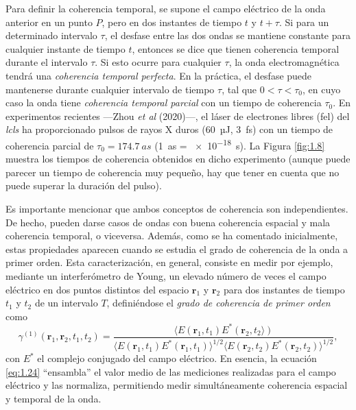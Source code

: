 Para definir la coherencia temporal, se supone el campo eléctrico de la onda anterior en un punto $P$, pero en dos instantes de tiempo $t$ y $t+\tau$. Si para un determinado intervalo $\tau$, el desfase entre las dos ondas se mantiene constante para cualquier instante de tiempo $t$, entonces se dice que tienen coherencia temporal durante el intervalo $\tau$. Si esto ocurre para cualquier $\tau$, la onda electromagnética tendrá una \emph{coherencia temporal perfecta}. En la práctica, el desfase puede mantenerse durante cualquier intervalo de tiempo $\tau$, tal que $0<\tau<\tau_0$, en cuyo caso la onda tiene \emph{coherencia temporal parcial} con un tiempo de coherencia $\tau_0$. En experimentos recientes ---Zhou \emph{et al} (2020)---\autocite{Zhou2020}, el láser de electrones libres (\acrshort{fel}) del \emph{\acrfull{lcls}} ha proporcionado pulsos de rayos X duros (\qty{60}{µJ}, \qty{3}{fs}) con un tiempo de coherencia parcial de $\tau_0 = \qty{174,7}{as}$ (\qty{1}{as} = \qty{e-18}{s}). La Figura \ref{fig:1.8} muestra los tiempos de coherencia obtenidos en dicho experimento (aunque puede parecer un tiempo de coherencia muy pequeño, hay que tener en cuenta que no puede superar la duración del pulso). 

Es importante mencionar que ambos conceptos de coherencia son independientes. De hecho, pueden darse casos de ondas con buena coherencia espacial y mala coherencia temporal, o viceversa. Además, como se ha comentado inicialmente, estas propiedades aparecen cuando se estudia el grado de coherencia de la onda a primer orden. Esta caracterización, en general, consiste en medir por ejemplo, mediante un interferómetro de Young, un elevado número de veces el campo eléctrico en dos puntos distintos del espacio $\symbf{r}_1$ y $\symbf{r}_2$ para dos instantes de tiempo $t_1$ y $t_2$ de un intervalo $T$, definiéndose el \emph{grado de coherencia de primer orden} como
\begin{equation}\label{eq:1.24}
  \gamma^{(1)}(\symbf{r}_{1},\symbf{r}_{2},t_{1},t_{2}) = \frac{\langle E(\symbf{r}_{1},t_{1})E^{*}(\symbf{r}_{2},t_{2}\rangle)}{\langle E(\symbf{r}_{1},t_{1})E^{*}(\symbf{r}_{1},t_{1}) \rangle^{1/2} \langle E(\symbf{r}_{2},t_{2})E^{*}(\symbf{r}_{2},t_{2}) \rangle^{1/2}},
\end{equation}
con $E^{*}$ el complejo conjugado del campo eléctrico. En esencia, la ecuación \eqref{eq:1.24} \enquote{ensambla} el valor medio de las mediciones realizadas para el campo eléctrico y las normaliza, permitiendo medir simultáneamente coherencia espacial y temporal de la onda.

